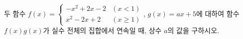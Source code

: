 두 함수 $f(x)=\begin{cases} -x^2+2x-2 & (x<1) \\ x^2-2x+2 & (x\ge 1) \end{cases}$, $g(x)=ax+5$에 대하여 함수 $f(x)g(x)$가 실수 전체의 집합에서 연속일 때, 상수 $a$의 값을 구하시오.
